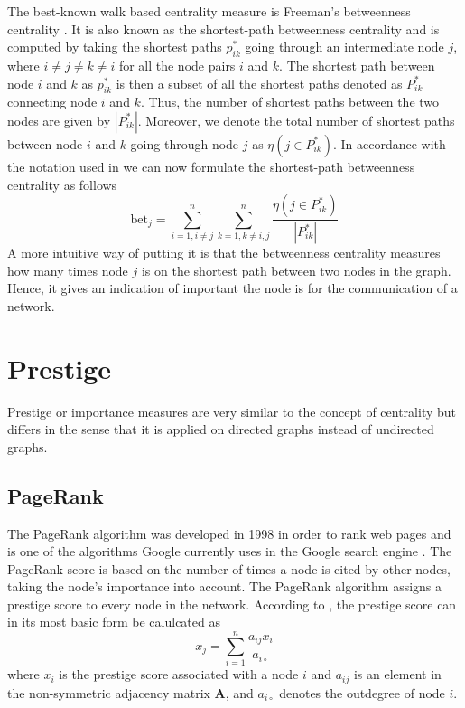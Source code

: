 The best-known walk based centrality measure is Freeman's betweenness centrality \citep{fouss2016algorithms}. It is also known as the shortest-path betweenness centrality and is computed by taking the shortest paths $p_{ik}^*$ going through an intermediate node $j$, where $i\neq j \neq k\neq i$ for all the node pairs $i$ and $k$. The shortest path between node $i$ and $k$ as $p_{ik}^*$ is then a subset of all the shortest paths denoted as $P_{ik}^*$ connecting node $i$ and $k$. Thus, the number of shortest paths between the two nodes are given by $|P_{ik}^*|$. Moreover, we denote the total number of shortest paths between node $i$ and $k$ going through node $j$ as $\eta(j \in P_{ik}^*)$. In accordance with the notation used in \citep{fouss2016algorithms} we can now formulate the shortest-path betweenness centrality as follows
\begin{equation}
    \text{bet}_j=\sum_{i=1, i\neq j}^{n} \sum_{k=1, k \neq i,j}^{n} \frac{\eta(j \in P_{ik}^*)}{|P_{ik}^*|}
\end{equation}
A more intuitive way of putting it is that the betweenness centrality measures how many times node $j$ is on the shortest path between two nodes in the graph. Hence, it gives an indication of important the node is for the communication of a network. 

\section{Prestige}
Prestige or importance measures are very similar to the concept of centrality but differs in the sense that it is applied on directed graphs instead of undirected graphs. 

\subsection{PageRank}
The PageRank algorithm was developed in 1998 in order to rank web pages and is one of the algorithms Google currently uses in the Google search engine \cite{langville2004deeperinside,langville2012}. The PageRank score is based on the number of times a node is cited by other nodes, taking the node's importance into account. The PageRank algorithm assigns a prestige score to every node in the network. According to \citet{fouss2016algorithms}, the prestige score can in its most basic form be calulcated as 
\begin{equation}
    x_j=\sum_{i=1}^{n} \frac{a_{ij}x_i}{a_{i\circ}}
\end{equation}
where $x_i$ is the prestige score associated with a node $i$ and $a_{ij}$ is an element in the non-symmetric adjacency matrix $\textbf{A}$, and $a_{i\circ}$ denotes the outdegree of node $i$. 

